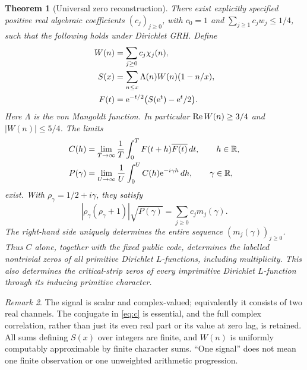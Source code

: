 \documentclass[11pt]{article}
\newtheorem{theorem}{Theorem}
\theoremstyle{remark}\newtheorem{remark}[theorem]{Remark}
\newcommand{\R}{\mathbb R}\newcommand{\C}{\mathbb C}\newcommand{\N}{\mathbb N}\newcommand{\Z}{\mathbb Z}\newcommand{\Q}{\mathbb Q}
\begin{document}
\begin{theorem}[Universal zero reconstruction]\label{thm:main}
There exist explicitly specified positive real algebraic coefficients $(c_j)_{j\ge0}$, with $c_0=1$ and $\sum_{j\ge1}c_j w_j\le1/4$, such that the following holds under Dirichlet GRH. Define
\begin{align*}
W(n)&=\sum_{j\ge0}c_j\chi_j(n),\\
S(x)&=\sum_{n\le x}\Lambda(n)W(n)(1-n/x),\\
F(t)&=\mathrm e^{-t/2}\bigl(S(\mathrm e^t)-\mathrm e^t/2\bigr).
\end{align*}
Here $\Lambda$ is the von Mangoldt function. In particular $\operatorname{Re} W(n)\ge3/4$ and $|W(n)|\le5/4$. The limits
\begin{align}
C(h)&=\lim_{T\to\infty}\frac1T\int_0^T F(t+h)\overline{F(t)}\,dt,\qquad h\in\R,\label{eq:c}\\
P(\gamma)&=\lim_{U\to\infty}\frac1U\int_0^U C(h)\e^{-i\gamma h}\,dh,\qquad\gamma\in\R,\label{eq:p}
\end{align}
exist. With $\rho_\gamma=1/2+i\gamma$, they satisfy
\begin{equation}\label{eq:recover}
\boxed{\quad |\rho_\gamma(\rho_\gamma+1)|\sqrt{P(\gamma)}
=\sum_{j\ge0}c_j m_j(\gamma).\quad}
\end{equation}
The right-hand side uniquely determines the entire sequence $(m_j(\gamma))_{j\ge0}$. Thus $C$ alone, together with the fixed public code, determines the labelled nontrivial zeros of all primitive Dirichlet $L$-functions, including multiplicity. This also determines the critical-strip zeros of every imprimitive Dirichlet $L$-function through its inducing primitive character.
\end{theorem}

\begin{remark}
The signal is scalar and complex-valued; equivalently it consists of two real channels. The conjugate in \eqref{eq:c} is essential, and the full complex correlation, rather than just its even real part or its value at zero lag, is retained. All sums defining $S(x)$ over integers are finite, and $W(n)$ is uniformly computably approximable by finite character sums. ``One signal'' does not mean one finite observation or one unweighted arithmetic progression.
\end{remark}
\end{document}
